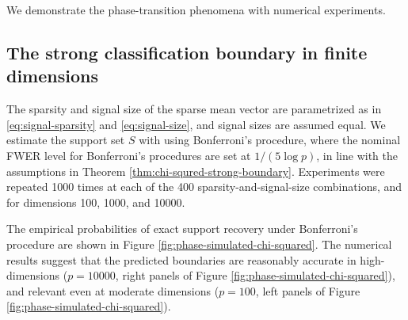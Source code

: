 We demonstrate the phase-transition phenomena with numerical experiments.

\subsection{The strong classification boundary in finite dimensions}

The sparsity and signal size of the sparse mean vector are parametrized as in \eqref{eq:signal-sparsity} and \eqref{eq:signal-size}, and signal sizes are assumed  equal.
We estimate the support set $S$ with using Bonferroni's procedure, where the nominal FWER level for Bonferroni's procedures are set at $1/(5{\log{p}})$, in line with the assumptions in Theorem \ref{thm:chi-squred-strong-boundary}.
Experiments were repeated 1000 times at each of the 400 sparsity-and-signal-size combinations, and for dimensions 100, 1000, and 10000.

The empirical probabilities of exact support recovery under Bonferroni's procedure are shown in Figure \ref{fig:phase-simulated-chi-squared}.
The numerical results suggest that the predicted boundaries are reasonably accurate in high-dimensions ($p=10000$, right panels of Figure \ref{fig:phase-simulated-chi-squared}), and relevant even at moderate dimensions ($p=100$, left panels of Figure \ref{fig:phase-simulated-chi-squared}).

